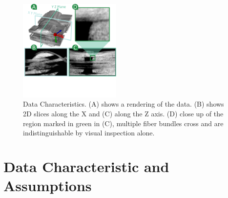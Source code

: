\begin{figure}[tb]
\centering
\includegraphics[width=0.45\textwidth, trim = 0mm 110mm 0mm 0mm, clip,]{imagesMT2014/image1B.pdf}
\caption{Data Characteristics. (A) shows a rendering of the data. (B) shows 2D slices along the X and (C) along the Z axis. (D) close up of the region marked in green in (C), multiple fiber bundles cross and are indistinguishable by visual inspection alone. }
\label{fig:data-char}
\end{figure}
\section {Data Characteristic and Assumptions}
\label{sec:char_data}

